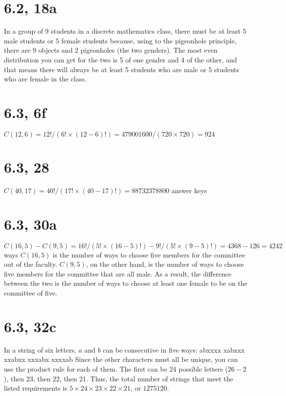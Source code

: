 \documentclass{article}
\begin{document}
\section{6.2, 18a}
In a group of 9 students in a discrete mathematics class, there must be at least 5 male students or 5 female students because, using to the pigeonhole principle, there are 9 objects and 2 pigeonholes (the two genders). The most even distribution you can get for the two is 5 of one gender and 4 of the other, and that means there will always be at least 5 students who are male or 5 students who are female in the class.

\section{6.3, 6f}
$C(12, 6) = 12!/(6! \times (12 - 6)!) = 479001600/(720 \times 720) = 924$

\section{6.3, 28}
$C(40, 17) = 40!/(17! \times (40 - 17)!) = 88732378800$ answer keys

\section{6.3, 30a}
$C(16, 5) - C(9, 5) = 16!/(5! \times (16 - 5)!) - 9!/(5! \times (9 - 5)!) = 4368 - 126 = 4242$ ways
\newline
$C(16, 5)$ is the number of ways to choose five members for the committee out of the faculty. $C(9, 5)$, on the other hand, is the number of ways to choose five members for the committee that are all male. As a result, the difference between the two is the number of ways to choose at least one female to be on the committee of five.

\section{6.3, 32c}
In a string of six letters, $a$ and $b$ can be consecutive in five ways:
\newline
abxxxx
\newline
xabxxx
\newline
xxabxx
\newline
xxxabx
\newline
xxxxab
\newline
Since the other characters must all be unique, you can use the product rule for each of them. The first can be 24 possible letters ($26 - 2$), then 23, then 22, then 21. Thus, the total number of strings that meet the listed requirements is $5 \times 24 \times 23 \times 22 \times 21$, or $1275120$.
\end{document}
